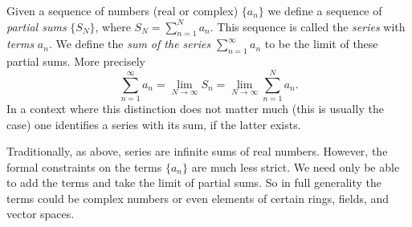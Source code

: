 \documentclass[12pt]{article}
\begin{document}
Given a sequence of numbers (real or complex) $\{a_n\}$ we define a sequence of \textit{partial
sums} $\{S_N\}$, where $S_N=\sum_{n=1}^N a_n$. This sequence is called the \textit{series} with \textit{terms} $a_n$. We define the \textit{sum of the series}
$\sum_{n=1}^\infty a_n$ to be the limit of these partial sums. More precisely
\[
 \sum_{n=1}^\infty a_n = \lim_{N\to\infty} S_n
    = \lim_{N\to\infty} \sum_{n=1}^N a_n.
\]
In a context where this distinction does not matter much (this is usually the case) one identifies a series with its sum, if the latter exists.

Traditionally, as above, series are infinite sums of real numbers. However,
the formal constraints on the terms $\{a_n\}$ are much less strict. We need
only be able to add the terms and take the limit of partial sums. So in full
generality the terms could be complex numbers or even elements of certain rings,
fields, and vector spaces.
\end{document}
